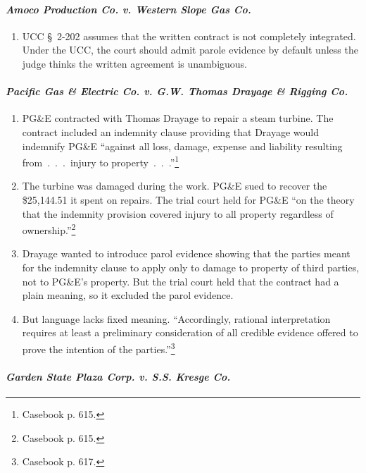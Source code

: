 \paragraph{\emph{Amoco Production Co. v. Western Slope Gas Co.}}

\begin{enumerate}
    \item UCC \S\ 2-202 assumes that the written contract is not completely 
    integrated. Under the UCC, the court should admit parole evidence by 
    default unless the judge thinks the written agreement is unambiguous.
\end{enumerate}

\paragraph{\emph{Pacific Gas \& Electric Co. v. G.W. Thomas Drayage \& Rigging 
Co.}}

\begin{enumerate}
    \item PG\&E contracted with Thomas Drayage to repair a steam turbine. The 
    contract included an indemnity clause providing that Drayage would 
    indemnify PG\&E ``against all loss, damage, expense and liability 
    resulting from~.~.~.~injury to property~.~.~.''\footnote{Casebook p. 
    615.}
    \item The turbine was damaged during the work. PG\&E sued to recover the 
    \$25,144.51 it spent on repairs. The trial court held for PG\&E ``on the 
    theory that the indemnity provision covered injury to all property 
    regardless of ownership.''\footnote{Casebook p. 615.}
    \item Drayage wanted to introduce parol evidence showing that the parties 
    meant for the indemnity clause to apply only to damage to property of 
    third parties, not to PG\&E's property. But the trial court held that the 
    contract had a plain meaning, so it excluded the parol evidence.
    \item But language lacks fixed meaning. ``Accordingly, rational 
    interpretation requires at least a preliminary consideration of all 
    credible evidence offered to prove the intention of the 
    parties.''\footnote{Casebook p. 617.}
\end{enumerate}

\paragraph{\emph{Garden State Plaza Corp. v. S.S. Kresge Co.}}

